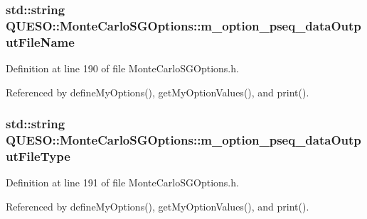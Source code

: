 \hypertarget{class_q_u_e_s_o_1_1_monte_carlo_s_g_options_a52759ecc968b903de4d651127f6e9a03}{
\subsubsection[{m\-\_\-option\-\_\-pseq\-\_\-data\-Output\-File\-Name}]{\setlength{\rightskip}{0pt plus 5cm}std\-::string Q\-U\-E\-S\-O\-::\-Monte\-Carlo\-S\-G\-Options\-::m\-\_\-option\-\_\-pseq\-\_\-data\-Output\-File\-Name\hspace{0.3cm}{\ttfamily [private]}}}\label{class_q_u_e_s_o_1_1_monte_carlo_s_g_options_a52759ecc968b903de4d651127f6e9a03}


Definition at line 190 of file Monte\-Carlo\-S\-G\-Options.\-h.



Referenced by define\-My\-Options(), get\-My\-Option\-Values(), and print().

\hypertarget{class_q_u_e_s_o_1_1_monte_carlo_s_g_options_af894e246867b1b73f66322df656c44c8}{
\subsubsection[{m\-\_\-option\-\_\-pseq\-\_\-data\-Output\-File\-Type}]{\setlength{\rightskip}{0pt plus 5cm}std\-::string Q\-U\-E\-S\-O\-::\-Monte\-Carlo\-S\-G\-Options\-::m\-\_\-option\-\_\-pseq\-\_\-data\-Output\-File\-Type\hspace{0.3cm}{\ttfamily [private]}}}\label{class_q_u_e_s_o_1_1_monte_carlo_s_g_options_af894e246867b1b73f66322df656c44c8}


Definition at line 191 of file Monte\-Carlo\-S\-G\-Options.\-h.



Referenced by define\-My\-Options(), get\-My\-Option\-Values(), and print().

